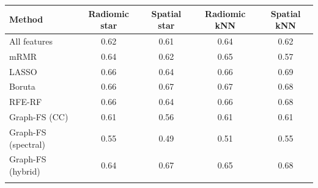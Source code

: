 \begin{tabular}{@{}lcccc@{}}
\toprule
Method & Radiomic star & Spatial star & Radiomic kNN & Spatial kNN \\
\midrule
All features & 0.62 & 0.61 & 0.64 & 0.62 \\
mRMR & 0.64 & 0.62 & 0.65 & 0.57 \\
LASSO & 0.66 & 0.64 & 0.66 & 0.69 \\
Boruta & 0.66 & 0.67 & 0.67 & 0.68 \\
RFE-RF & 0.66 & 0.64 & 0.66 & 0.68 \\
Graph-FS (CC) & 0.61 & 0.56 & 0.61 & 0.61 \\
Graph-FS (spectral) & 0.55 & 0.49 & 0.51 & 0.55 \\
Graph-FS (hybrid) & 0.64 & 0.67 & 0.65 & 0.68 \\
\botrule
\end{tabular}
